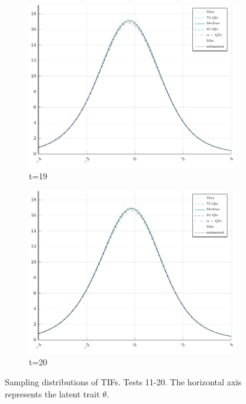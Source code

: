 \begin{figure}[H]
\begin{subfigure}[t]{0.31\textwidth}
		\includegraphics[width=\linewidth]{Figures/real/19_infoplot.pdf}
		\caption{t=19} 
	\end{subfigure}
	\begin{subfigure}[t]{0.31\textwidth}
		\centering
		\includegraphics[width=\linewidth]{Figures/real/20_infoplot.pdf}
		\caption{t=20} 
	\end{subfigure}
	\caption{Sampling distributions of TIFs. Tests 11-20. The horizontal axis represents the latent trait $\theta$. \label{fig:taTIF2}}
\end{figure}

